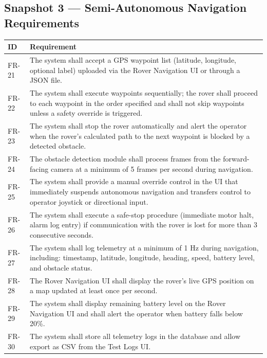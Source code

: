 \documentclass{article}
\begin{document}
\subsection{Snapshot 3 --- Semi-Autonomous Navigation Requirements}

\begin{longtable}{|p{0.8in}|p{5.4in}|}
\hline
\textbf{ID} & \textbf{Requirement} \\
\hline
FR-21 & The system shall accept a GPS waypoint list (latitude, longitude, optional label)
  uploaded via the Rover Navigation UI or through a JSON file. \\
\hline
FR-22 & The system shall execute waypoints sequentially; the rover shall proceed to each
  waypoint in the order specified and shall not skip waypoints unless a safety override
  is triggered. \\
\hline
FR-23 & The system shall stop the rover automatically and alert the operator when the
  rover's calculated path to the next waypoint is blocked by a detected obstacle. \\
\hline
FR-24 & The obstacle detection module shall process frames from the forward-facing camera
  at a minimum of 5 frames per second during navigation. \\
\hline
FR-25 & The system shall provide a manual override control in the UI that immediately
  suspends autonomous navigation and transfers control to operator joystick or directional
  input. \\
\hline
FR-26 & The system shall execute a safe-stop procedure (immediate motor halt, alarm log
  entry) if communication with the rover is lost for more than 3 consecutive seconds. \\
\hline
FR-27 & The system shall log telemetry at a minimum of 1 Hz during navigation, including:
  timestamp, latitude, longitude, heading, speed, battery level, and obstacle status. \\
\hline
FR-28 & The Rover Navigation UI shall display the rover's live GPS position on a map
  updated at least once per second. \\
\hline
FR-29 & The system shall display remaining battery level on the Rover Navigation UI and
  shall alert the operator when battery falls below 20\%. \\
\hline
FR-30 & The system shall store all telemetry logs in the database and allow export as
  CSV from the Test Logs UI. \\
\hline
\end{longtable}
\end{document}
